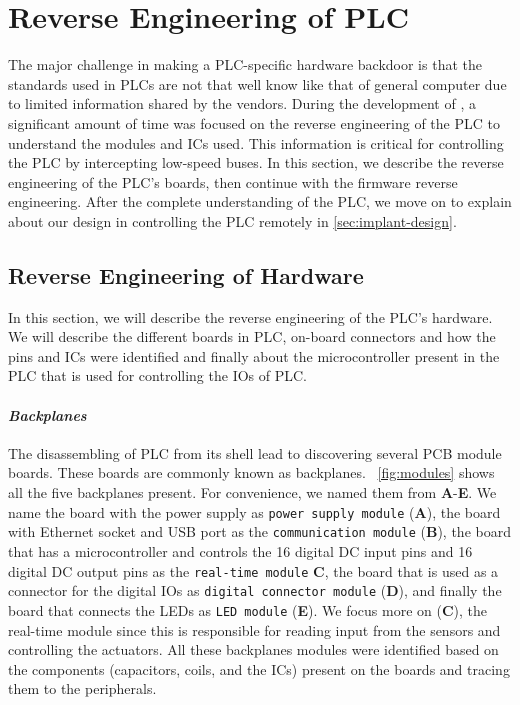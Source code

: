 \section{Reverse Engineering of PLC}
\label{sec:implant-design}

The major challenge in making a PLC-specific hardware backdoor is that the standards used in PLCs are not that well know like that of general computer due to limited information shared by the vendors. During the development of \name, a significant amount of time was focused on the reverse engineering of the PLC to understand the modules and ICs used. This information is critical for controlling the PLC by intercepting low-speed buses. In this section, we describe the reverse engineering of the PLC's boards, then continue with the firmware reverse engineering. After the complete understanding of the PLC, we move on to explain about our design in controlling the PLC remotely in \autoref{sec:implant-design}.


\subsection{Reverse Engineering of Hardware}

In this section, we will describe the reverse engineering of the PLC's hardware. We will describe the different boards in PLC, on-board connectors and how the pins and ICs were identified and finally about the microcontroller present in the PLC that is used for controlling the IOs of PLC.

\paragraph{\textbf{\textit{Backplanes}}} The disassembling of PLC from its shell lead to discovering several PCB module boards. These boards are commonly known as backplanes. ~\autoref{fig:modules} shows all the five backplanes present. For convenience, we named them from \textbf{A}-\textbf{E}. We name the board with the power supply as \texttt{power supply module} (\textbf{A}), the board with Ethernet socket and USB port as the \texttt{communication module} (\textbf{B}), the board that has a microcontroller and controls the 16 digital DC input pins and 16 digital DC output pins as the \texttt{real-time module} {\textbf{C}}, the board that is used as a connector for the digital IOs as \texttt{digital connector module} (\textbf{D}), and finally the board that connects the LEDs as \texttt{LED module} (\textbf{E}). We focus more on (\textbf{C}), the real-time module since this is responsible for reading input from the sensors and controlling the actuators. All these backplanes modules were identified based on the components (capacitors, coils, and the ICs) present on the boards and tracing them to the peripherals. 

